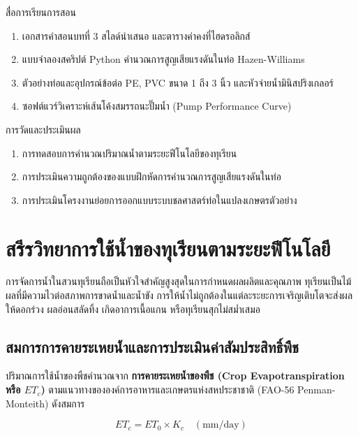 \begin{planbox}{สื่อการเรียนการสอน}
\begin{enumerate}[topsep=2pt, itemsep=1pt, partopsep=0pt, parsep=0pt, leftmargin=1.5em]
    \item เอกสารคำสอนบทที่ 3 สไลด์นำเสนอ และตารางค่าคงที่ไฮดรอลิกส์
    \item แบบจำลองสคริปต์ Python คำนวณการสูญเสียแรงดันในท่อ Hazen-Williams
    \item ตัวอย่างท่อและอุปกรณ์ข้อต่อ PE, PVC ขนาด 1 ถึง 3 นิ้ว และหัวจ่ายน้ำมินิสปริงเกลอร์
    \item ซอฟต์แวร์วิเคราะห์เส้นโค้งสมรรถนะปั๊มน้ำ (Pump Performance Curve)
\end{enumerate}
\end{planbox}

\begin{planbox}{การวัดและประเมินผล}
\begin{enumerate}[topsep=2pt, itemsep=1pt, partopsep=0pt, parsep=0pt, leftmargin=1.5em]
    \item การทดสอบการคำนวณปริมาณน้ำตามระยะฟีโนโลยีของทุเรียน
    \item การประเมินความถูกต้องของแบบฝึกหัดการคำนวณการสูญเสียแรงดันในท่อ
    \item การประเมินโครงงานย่อยการออกแบบระบบชลศาสตร์ท่อในแปลงเกษตรตัวอย่าง
\end{enumerate}
\end{planbox}

\clearpage

\section{สรีรวิทยาการใช้น้ำของทุเรียนตามระยะฟีโนโลยี}

การจัดการน้ำในสวนทุเรียนถือเป็นหัวใจสำคัญสูงสุดในการกำหนดผลผลิตและคุณภาพ ทุเรียนเป็นไม้ผลที่มีความไวต่อสภาพการขาดน้ำและน้ำขัง การให้น้ำไม่ถูกต้องในแต่ละระยะการเจริญเติบโตจะส่งผลให้ดอกร่วง ผลอ่อนสลัดทิ้ง เกิดอาการเนื้อแกน หรือทุเรียนสุกไม่สม่ำเสมอ

\subsection{สมการการคายระเหยน้ำและการประเมินค่าสัมประสิทธิ์พืช}

ปริมาณการใช้น้ำของพืชคำนวณจาก \textbf{การคายระเหยน้ำของพืช (Crop Evapotranspiration หรือ $ET_c$)} ตามแนวทางขององค์การอาหารและเกษตรแห่งสหประชาชาติ (FAO-56 Penman-Monteith) ดังสมการ

\begin{equation}
ET_c = ET_0 \times K_c \quad (\text{mm/day})
\label{eq:etc}
\end{equation}

